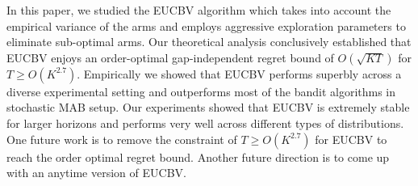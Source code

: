 In this paper, we studied the EUCBV algorithm which takes into account the empirical variance of the arms and employs aggressive exploration parameters to eliminate sub-optimal arms. Our theoretical analysis conclusively established that EUCBV enjoys an order-optimal gap-independent regret bound of $O\left(\sqrt{KT}\right)$ for $T\geq O\left( K^{2.7}\right)$. Empirically we showed that EUCBV performs superbly across a diverse experimental setting and outperforms most of the bandit algorithms in stochastic  MAB setup. Our experiments showed that EUCBV is extremely stable for larger horizons and performs very well across different types of distributions. One future work is to remove the constraint of $T\geq O\left( K^{2.7}\right)$ for EUCBV to reach the order optimal regret bound. Another future direction is to come up with an anytime version of EUCBV. 